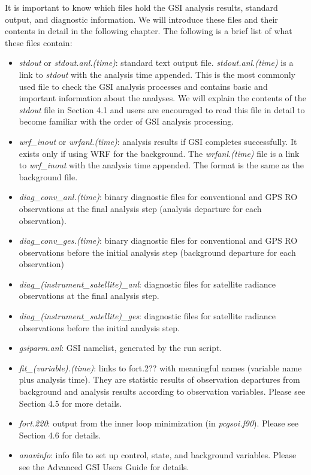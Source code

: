 It is important to know which files hold the GSI analysis results, standard output, and diagnostic information. We will introduce these files and their contents in detail in the following chapter. The following is a brief list of what these files contain:
\begin{itemize}
  \item \textit{stdout} or \textit{stdout.anl.(time)}: standard text output file.  \textit{stdout.anl.(time)} is a link to \textit{stdout} with the analysis time appended. This is the most commonly used file to check the GSI analysis processes and contains basic and important information about the analyses. We will explain the contents of the \textit{stdout} file in Section 4.1 and users are encouraged to read this file in detail to become familiar with the order of GSI analysis processing.
  \item \textit{wrf\_inout} or \textit{wrfanl.(time)}: analysis results if GSI completes successfully. It exists only if using WRF for the background. The \textit{wrfanl.(time)} file is a link to \textit{wrf\_inout} with the analysis time appended. The format is the same as the background file.
\item \textit{diag\_conv\_anl.(time)}: binary diagnostic files for conventional and GPS RO observations at the final analysis step (analysis departure for each observation). 
\item \textit{diag\_conv\_ges.(time)}: binary diagnostic files for conventional and GPS RO observations before the initial analysis step (background departure for each observation)
\item \textit{diag\_(instrument\_satellite)\_anl}: diagnostic files for satellite radiance observations at the final analysis step. 
\item \textit{diag\_(instrument\_satellite)\_ges}: diagnostic files for satellite radiance observations before the initial analysis step.
\item \textit{gsiparm.anl}:   GSI namelist, generated by the run script.
\item \textit{fit\_(variable).(time)}: links to fort.2?? with meaningful names (variable name plus analysis time). They are statistic results of observation departures from background and analysis results according to observation variables. Please see Section 4.5 for more details. 
\item \textit{fort.220}: output from the inner loop minimization (in \textit{pcgsoi.f90}). Please see Section 4.6 for details.
\item \textit{anavinfo}: info file to set up control, state, and background variables. Please see the Advanced GSI User\textquotesingle s Guide for details.

\end{itemize}
